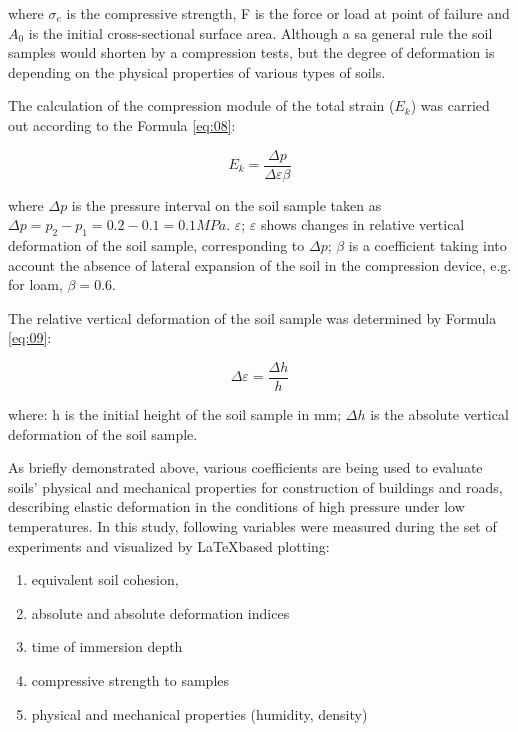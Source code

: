 \documentclass[a4paper,10pt]{article}
\begin{document}
where $\sigma_{e}$ is the compressive strength, F is the force or load at point of failure and $A_{0}$ is the initial cross-sectional surface area. Although a sa general rule the soil samples would shorten by a compression tests, but the degree of deformation is depending on the physical properties of various types of soils. 

The calculation of the compression module of the total strain ($E_{k}$) was carried out according to the Formula \ref{eq:08}:  

\begin{equation}\label{eq:08}
	E_{k}=\frac{\Delta p}{\Delta \varepsilon \beta}
\end{equation}
 
 where $\Delta p$ is the pressure interval on the soil sample taken as 
 $\Delta p=p_{2}-p_{1}=0.2-0.1=0.1MPa$.
 $\varepsilon$; $\varepsilon$ shows changes in relative vertical deformation of the soil sample, corresponding to $\Delta p$; $\beta$ is a coefficient taking into account the absence of lateral expansion of the soil in the compression device, e.g. for loam, $\beta = 0.6$.
 
The relative vertical deformation of the soil sample was determined by Formula \ref{eq:09}:  

\begin{equation}\label{eq:09}
	\Delta \varepsilon=\frac{\Delta h}{h}
\end{equation}

 where: h is the initial height of the soil sample in mm; $\Delta h$ is the absolute vertical deformation of the soil sample.
 
As briefly demonstrated above, various coefficients are being used to evaluate soils' physical and mechanical properties for construction of buildings and roads, describing elastic deformation in the conditions of high pressure under low temperatures. In this study, following variables were measured during the set of experiments and visualized by \LaTeX \space based plotting:

\begin{enumerate}[leftmargin=1cm]
	\item equivalent soil cohesion,
	\item absolute and absolute deformation indices	
	\item time of immersion depth
	\item compressive strength to samples
	\item physical and mechanical properties (humidity, density)
\end{enumerate}
\end{document}
